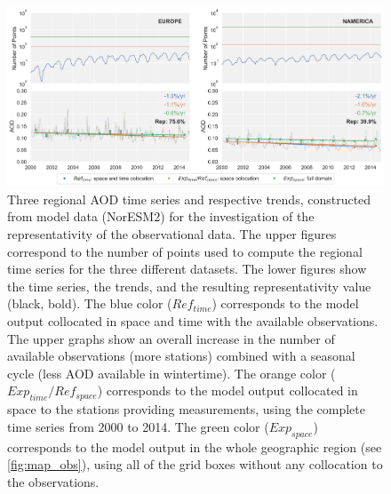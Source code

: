 \documentclass[acp, manuscript]{copernicus}
\begin{document}
\clearpage
\begin{figure}[t]
 \includegraphics[width=16cm]{../scripts/figs/representativity-od550aer-lines.png}
 \caption{Three regional AOD time series and respective trends,  constructed from model data (NorESM2) for the investigation of the representativity of the observational data. The upper figures correspond to the number of points used to compute the regional time series for the three different datasets. The lower figures show the time series, the trends, and the resulting representativity value (black, bold). The blue color ($Ref_{time}$) corresponds to the model output collocated in space and time with the available observations. The upper graphs show an overall increase in the number of available observations (more stations) combined with a seasonal cycle (less AOD available in wintertime). The orange color ($Exp_{time}/Ref_{space}$) corresponds to the model output collocated in space to the stations providing measurements, using the complete time series from 2000 to 2014. The green color ($Exp_{space}$) corresponds to the model output in the whole geographic region (see \ref{fig:map_obs}), using all of the grid boxes without any collocation to the observations.}
 \label{fig:representativity}
\end{figure}
\end{document}
